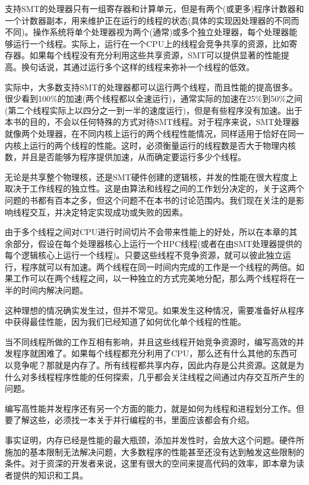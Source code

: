 支持SMT的处理器只有一组寄存器和计算单元，但是有两个(或更多)程序计数器和一个计数器副本，用来维护正在运行的线程的状态(具体的实现因处理器的不同而不同)。操作系统将单个处理器视为两个(通常)或多个独立处理器，每个处理器能够运行一个线程。实际上，运行在一个CPU上的线程会竞争共享的资源，比如寄存器。如果每个线程没有充分利用这些共享资源，SMT可以提供显著的性能提高。换句话说，其通过运行多个这样的线程来弥补一个线程的低效。

实际中，大多数支持SMT的处理器都可以运行两个线程，而且性能的提高很多。很少看到100\%的加速(两个线程都以全速运行)，通常实际的加速在25\%到50\%之间(第二个线程实际上以四分之一到一半的速度运行)，但是有些程序没有加速。出于本书的目的，不会以任何特殊的方式对待SMT线程。对于程序来说，SMT处理器就像两个处理器，在不同内核上运行的两个线程性能情况，同样适用于恰好在同一内核上运行的两个线程的性能。这时，必须衡量运行的线程数是否大于物理内核数，并且是否能够为程序提供加速，从而确定要运行多少个线程。

无论是共享整个物理核，还是SMT硬件创建的逻辑核，并发的性能在很大程度上取决于工作线程的独立性。这是由算法和线程之间的工作划分决定的，关于这两个问题的书都有百本之多，但这个问题不在本书的讨论范围内。我们现在关注的是影响线程交互，并决定特定实现成功或失败的因素。


由于多个线程之间对CPU进行时间切片不会带来性能上的好处，所以在本章的其余部分，假设在每个处理器核心上运行一个HPC线程(或者在由SMT处理器提供的每个逻辑核心上运行一个线程)。只要这些线程不竞争资源，就可以彼此独立运行，程序就可以有加速。两个线程在同一时间内完成的工作是一个线程的两倍。如果工作可以在两个线程之间，以一种独立的方式完美地分配，那么两个线程将在一半的时间内解决问题。

这种理想的情况确实发生过，但并不常见。如果发生这种情况，需要准备好从程序中获得最佳性能，因为我们已经知道了如何优化单个线程的性能。

当不同线程所做的工作互相有影响，并且这些线程开始竞争资源时，编写高效的并发程序就困难了。如果每个线程都充分利用了CPU，那么还有什么其他的东西可以竞争呢？那就是内存了。所有线程都共享内存，因此内存是公共资源。这就是为什么对多线程程序性能的任何探索，几乎都会关注线程之间通过内存交互所产生的问题。

编写高性能并发程序还有另一个方面的能力，就是如何为线程和进程划分工作。但要了解这些，必须找一本关于并行编程的书，里面应该都会有介绍。

事实证明，内存已经是性能的最大瓶颈，添加并发性时，会放大这个问题。硬件所施加的基本限制无法解决问题，大多数程序的性能甚至还没有达到触发这些限制的条件。对于资深的开发者来说，这里有很大的空间来提高代码的效率，即本章为读者提供的知识和工具。

